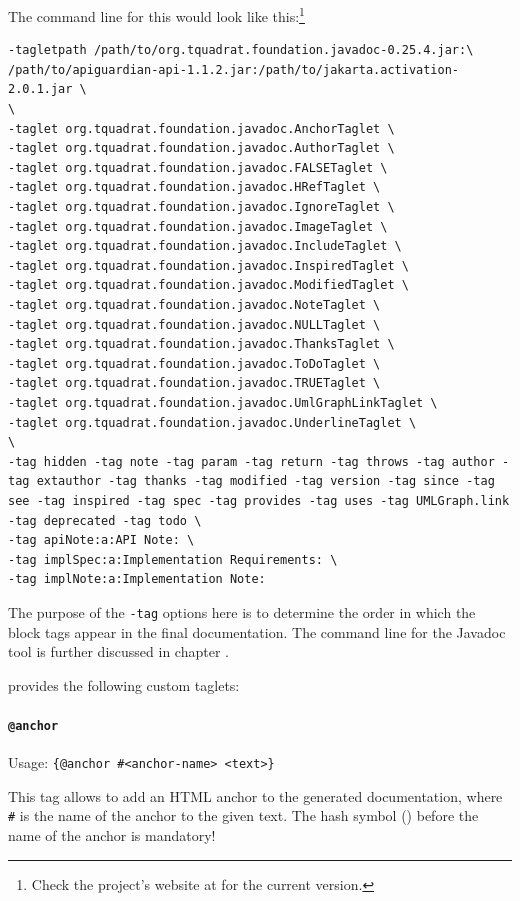 The command line for this would look like this:\footnote{Check the project's website at \autocite{TQUADRAT_ORG_FOUNDATION_JAVADOC} for the current version.}
\begin{lstlisting}
-tagletpath /path/to/org.tquadrat.foundation.javadoc-0.25.4.jar:\
/path/to/apiguardian-api-1.1.2.jar:/path/to/jakarta.activation-2.0.1.jar \
\
-taglet org.tquadrat.foundation.javadoc.AnchorTaglet \
-taglet org.tquadrat.foundation.javadoc.AuthorTaglet \
-taglet org.tquadrat.foundation.javadoc.FALSETaglet \
-taglet org.tquadrat.foundation.javadoc.HRefTaglet \
-taglet org.tquadrat.foundation.javadoc.IgnoreTaglet \
-taglet org.tquadrat.foundation.javadoc.ImageTaglet \
-taglet org.tquadrat.foundation.javadoc.IncludeTaglet \
-taglet org.tquadrat.foundation.javadoc.InspiredTaglet \
-taglet org.tquadrat.foundation.javadoc.ModifiedTaglet \
-taglet org.tquadrat.foundation.javadoc.NoteTaglet \
-taglet org.tquadrat.foundation.javadoc.NULLTaglet \
-taglet org.tquadrat.foundation.javadoc.ThanksTaglet \
-taglet org.tquadrat.foundation.javadoc.ToDoTaglet \
-taglet org.tquadrat.foundation.javadoc.TRUETaglet \
-taglet org.tquadrat.foundation.javadoc.UmlGraphLinkTaglet \
-taglet org.tquadrat.foundation.javadoc.UnderlineTaglet \
\
-tag hidden -tag note -tag param -tag return -tag throws -tag author -tag extauthor -tag thanks -tag modified -tag version -tag since -tag see -tag inspired -tag spec -tag provides -tag uses -tag UMLGraph.link -tag deprecated -tag todo \
-tag apiNote:a:API Note: \ 
-tag implSpec:a:Implementation Requirements: \
-tag implNote:a:Implementation Note: 
\end{lstlisting}

The purpose of the \texttt{-tag} options here is to determine the order in which the block tags appear in the final documentation. The command line for the Javadoc tool is further discussed in chapter .

\bdq{tquadrat’s Javadoc Extensions} provides the following custom taglets:

\keeplisting{4}
\paragraph{\lstinline|@anchor|}\label{sec:TagAnchor}  Usage: \lstinline|{@anchor #<anchor-name> <text>}|

This tag allows to add an HTML anchor to the generated documentation, where \texttt{\#<anchor-name>} is the name of the anchor to the given text. The hash symbol (\bsq{\#}) before the name of the anchor is mandatory!

